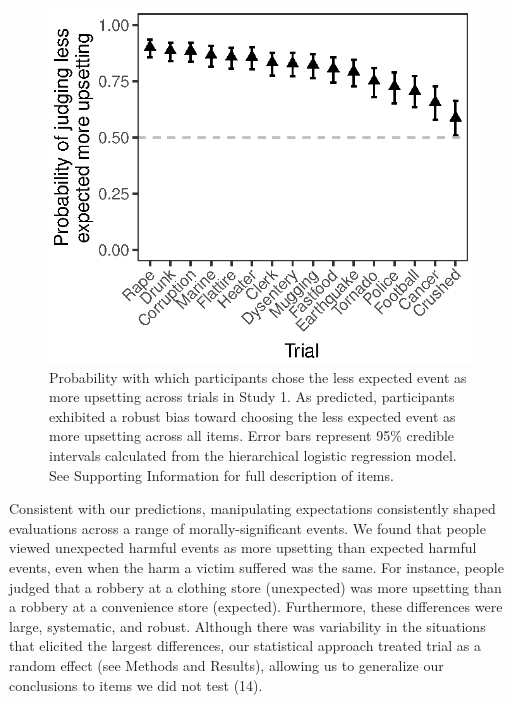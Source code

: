 \documentclass[9pt,twocolumn,twoside,]{pnas-new}
\begin{document}
\begin{figure}
\centering
\includegraphics{fig1.eps}
\caption{Probability with which participants chose the less expected
event as more upsetting across trials in Study 1. As predicted,
participants exhibited a robust bias toward choosing the less expected
event as more upsetting across all items. Error bars represent 95\%
credible intervals calculated from the hierarchical logistic regression
model. See Supporting Information for full description of items. {}}
\end{figure}

Consistent with our predictions, manipulating expectations consistently
shaped evaluations across a range of morally-significant events. We
found that people viewed unexpected harmful events as more upsetting
than expected harmful events, even when the harm a victim suffered was
the same. For instance, people judged that a robbery at a clothing store
(unexpected) was more upsetting than a robbery at a convenience store
(expected). Furthermore, these differences were large, systematic, and
robust. Although there was variability in the situations that elicited
the largest differences, our statistical approach treated trial as a
random effect (see Methods and Results), allowing us to generalize our
conclusions to items we did not test (14).
\end{document}
